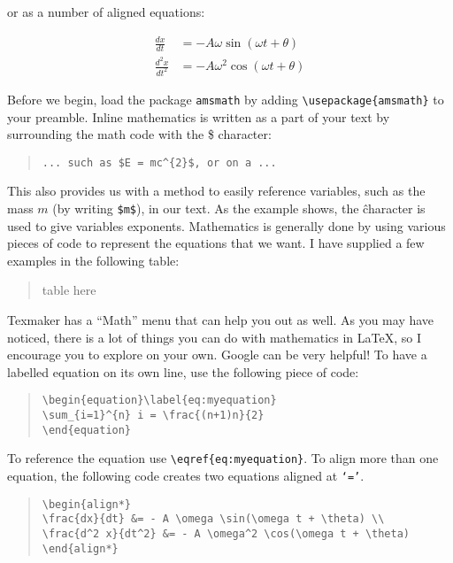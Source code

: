 \documentclass[a4paper,oneside]{memoir}
\begin{document}
or as a number of aligned equations:

\begin{align*}
\frac{dx}{dt} &= - A \omega \sin(\omega t + \theta) \\
\frac{d^2 x}{dt^2} &= - A \omega^2 \cos(\omega t + \theta)
\end{align*}

Before we begin, load the package \texttt{amsmath} by adding \lstinline$\usepackage{amsmath}$ to your preamble. Inline mathematics is written as a part of your text by surrounding the math code with the \$ character:

\begin{quote}
\begin{lstlisting}
... such as $E = mc^{2}$, or on a ...
\end{lstlisting}
\end{quote}

This also provides us with a method to easily reference variables, such as the mass $m$ (by writing \texttt{\$m\$}), in our text. As the example shows, the \^ character is used to give variables exponents. Mathematics is generally done by using various pieces of code to represent the equations that we want. I have supplied a few examples in the following table:

\begin{quote}
table here
\end{quote}

Texmaker has a \enquote{Math} menu that can help you out as well. As you may have noticed, there is a lot of things you can do with mathematics in \LaTeX{}, so I encourage you to explore on your own. Google can be very helpful! To have a labelled equation on its own line, use the following piece of code:

\begin{quote}
\begin{lstlisting}
\begin{equation}\label{eq:myequation}
\sum_{i=1}^{n} i = \frac{(n+1)n}{2}
\end{equation}
\end{lstlisting}
\end{quote}

To reference the equation use \lstinline$\eqref{eq:myequation}$. To align more than one equation, the following code creates two equations aligned at \texttt{`='}.

\begin{quote}
\begin{lstlisting}
\begin{align*}
\frac{dx}{dt} &= - A \omega \sin(\omega t + \theta) \\
\frac{d^2 x}{dt^2} &= - A \omega^2 \cos(\omega t + \theta)
\end{align*}
\end{lstlisting}
\end{quote}
\end{document}
